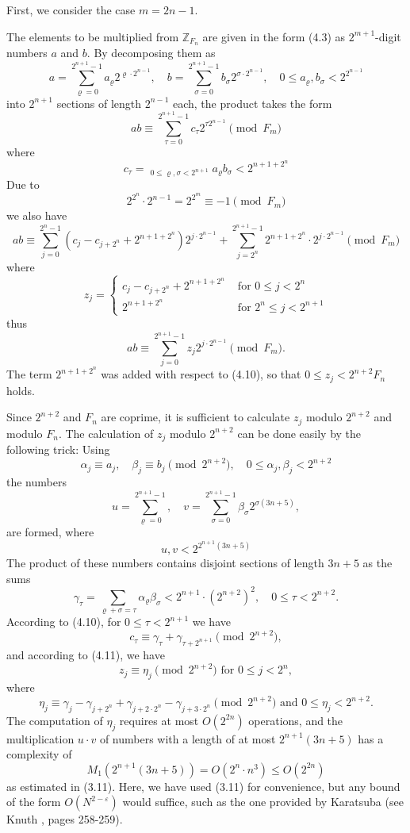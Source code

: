 \documentclass{article}
\begin{document}
First, we consider the case $m = 2n - 1$.

The elements to be multiplied from $\mathbb{Z}_{F_n}$ are given in the form (4.3) as $2^{m + 1}$-digit numbers $a$ and $b$. By decomposing them as
\[
\tag{4.9}
a = \sum_{\varrho = 0}^{2^{n + 1} - 1} a_\varrho 2^{\varrho \cdot 2^{n - 1}}, \quad b = \sum_{\sigma = 0}^{2^{n + 1} - 1} b_\sigma 2^{\sigma \cdot 2^{n - 1}}, \quad 0 \le a_\varrho, b_\sigma < 2^{2^{n - 1}}
\]
into $2^{n + 1}$ sections of length $2^{n - 1}$ each, the product takes the form
\[
ab \equiv \sum_{\tau = 0}^{2^{n + 1} - 1} c_\tau 2^{\tau 2^{n - 1}} \pmod{F_m}
\]
where
\[
\tag{4.10}
c_\tau = \mathop{\sum_{\varrho + \sigma \equiv \tau \pmod{2^{n + 1}}}}_{0 \le \varrho, \sigma < 2^{n + 1}} a_\varrho b_\sigma < 2^{n + 1 + 2^n}
\]
Due to
\[
2^{2^n} \cdot 2^{n - 1} = 2^{2^m} \equiv -1 \pmod{F_m}
\]
we also have
\[
ab \equiv \sum_{j = 0}^{2^n - 1} \left(c_j - c_{j + 2^n} + 2^{n + 1 + 2^n}\right) 2^{j \cdot 2^{n - 1}} + \sum_{j = 2^n}^{2^{n + 1} - 1} 2^{n + 1 + 2^n} \cdot 2^{j \cdot 2^{n - 1}} \pmod{F_m}
\]
where
\[
\tag{4.11}
z_j =
\begin{cases}
c_j - c_{j + 2^n} + 2^{n + 1 + 2^n} & \text{ for } 0 \le j < 2^n \\
2^{n + 1 + 2^n} & \text{ for } 2^n \le j < 2^{n + 1}
\end{cases}
\]
thus
\[
\tag{4.12}
ab \equiv \sum_{j = 0}^{2^{n + 1} - 1} z_j 2^{j \cdot 2^{n - 1}} \pmod{F_m}.
\]
The term $2^{n + 1 + 2^n}$ was added with respect to (4.10), so that $0 \le z_j < 2^{n + 2} F_n$ holds.

Since $2^{n + 2}$ and $F_n$ are coprime, it is sufficient to calculate $z_j$ modulo $2^{n + 2}$ and modulo $F_n$. The calculation of $z_j$ modulo $2^{n + 2}$ can be done easily by the following trick: Using
\[
\alpha_j \equiv a_j, \quad \beta_j \equiv b_j \pmod{2^{n + 2}}, \quad 0 \le \alpha_j, \beta_j < 2^{n + 2}
\]
the numbers
\[
u = \sum_{\varrho = 0}^{2^{n + 1} - 1}, \quad v = \sum_{\sigma = 0}^{2^{n + 1} - 1} \beta_\sigma 2^{\sigma (3n + 5)},
\]
are formed, where
\[
u, v < 2^{2^{n + 1}(3n + 5)}
\]
The product of these numbers contains disjoint sections of length $3n + 5$ as the sums
\[
\gamma_\tau = \sum_{\varrho + \sigma = \tau} \alpha_\varrho \beta_\sigma < 2^{n + 1} \cdot \left(2^{n + 2}\right)^2, \quad 0 \le \tau < 2^{n + 2}.
\]
According to (4.10), for $0 \le \tau < 2^{n + 1}$ we have
\[
c_\tau \equiv \gamma_\tau + \gamma_{\tau + 2^{n + 1}} \pmod{2^{n + 2}},
\]
and according to (4.11), we have
\[
\tag{4.14}
z_j \equiv \eta_j \pmod{2^{n + 2}}\text{ for }0 \le j < 2^n,
\]
where
\[
\eta_j \equiv \gamma_j - \gamma_{j + 2^n} + \gamma_{j + 2 \cdot 2^n} - \gamma_{j + 3 \cdot 2^n} \pmod{2^{n + 2}}\text{ and }0 \le \eta_j < 2^{n + 2}.
\]
The computation of $\eta_j$ requires at most $O(2^{2n})$ operations, and the multiplication $u \cdot v$ of numbers with a length of at most $2^{n + 1} (3n + 5)$ has a complexity of
\[
M_1(2^{n + 1} (3n + 5)) = O(2^n \cdot n^3) \le O(2^{2n})
\]
as estimated in (3.11). Here, we have used (3.11) for convenience, but any bound of the form $O(N^{2 - \varepsilon})$ would suffice, such as the one provided by Karatsuba (see Knuth \cite{knuth}, pages 258-259).
\end{document}

